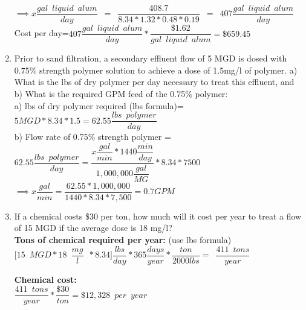 \documentclass{article}
\begin{document}
\begin{enumerate}
\vspace{0.25cm}
$ \implies x \dfrac{gal \enspace liquid \enspace alum}{day}\enspace = \enspace \dfrac{408.7}{8.34*1.32*0.48*0.19} \enspace = \enspace 407 \dfrac{gal \enspace liquid \enspace alum}{day}$\\
\vspace{0.25cm}
Cost per day=$407 \dfrac{gal \enspace liquid \enspace alum}{day}*\dfrac{\$1.62}{gal \enspace liquid \enspace alum}=\boxed{\$659.45}$
\vspace{0.25cm}
\item Prior to sand filtration, a secondary effluent flow of 5 MGD is dosed with 0.75\% strength polymer solution to achieve a dose of 1.5mg/l of polymer.  a) What is the lbs of dry polymer per day necessary to treat this effluent, and b) What is the required GPM feed of the 0.75\% polymer:\\
\vspace{0.25cm}
a)  lbs of dry polymer required (lbs formula)=$5MGD*8.34*1.5=\boxed{62.55 \dfrac{lbs \enspace polymer}{day}}$\\
\vspace{0.25cm}
b) Flow rate of 0.75\% strength polymer = $62.55 \dfrac{lbs \enspace polymer}{day}=\dfrac{x \dfrac{gal}{min}*1440\dfrac{min}{day}}{1,000,000\dfrac{gal}{MG}}*8.34*7500$\\
$ \implies x \dfrac{gal}{min}=\dfrac{62.55*1,000,000}{1440*8.34*7,500}=\boxed{0.7GPM}$\\
\vspace{0.3cm}

\item If a chemical costs \$30 per ton, how much will it cost per year to treat a flow of 15 MGD if the average dose is 18 mg/l?\\

\textbf{Tons of chemical required per year:} (use lbs formula)\\
\vspace{0.25cm}
 $\Big[15 \enspace MGD * 18 \enspace \dfrac{mg}{l}\enspace*8.34\Big]\dfrac{lbs}{day}* 365 \dfrac{days}{year}*\dfrac{ton}{2000lbs}=\enspace \dfrac{411 \enspace tons}{year}$

\textbf{Chemical cost:}\\
\vspace{0.25cm}
$\dfrac{411 \enspace tons}{year}*\dfrac{\$30}{ton}=\boxed{\$12,328 \enspace per \enspace year}$\\
\vspace{0.25cm}

\end{enumerate}
\end{document}
